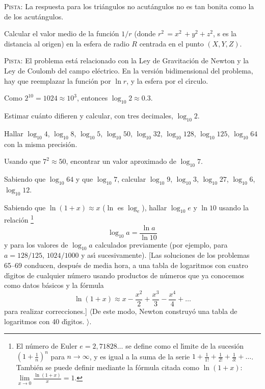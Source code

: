 \documentclass[12pt, spanish]{article}  %
\begin{document}
\textsc{Pista:} La respuesta para los tri\'angulos no acut\'angulos no es tan bonita como la de los acut\'angulos.


\bigskip
{} Calcular el valor medio de la funci\'on $1/r$ (donde
$r^2\,=x^2\,+y^2+z^2$, 
\newline
s es la distancia al origen) en la esfera de radio 
$R$ centrada en el punto $(X,Y,Z)$.

\medskip
\textsc{Pista:} El problema est\'a relacionado con la Ley de Gravitaci\'on de Newton y la Ley de Coulomb del campo el\'ectrico.
En la versi\'on bidimensional del problema, hay que reemplazar la funci\'on por $\ln r$, y la esfera por el c\'{\i}rculo.


\bigskip
{} Como $2^{10}=1024 \approx 10^3$, entonces
$\log_{10} 2 \approx 0{.}3$.

Estimar cu\'anto difieren y calcular, con tres decimales, $\log_{10} 2$. 

\bigskip
{} Hallar $\log_{10} 4$, $\log_{10} 8$,
$\log_{10} 5$, $\log_{10} 50$, $\log_{10} 32$, $\log_{10} 128$,
$\log_{10} 125$, $\log_{10} 64$ con la misma precisi\'on.

\bigskip
{} Usando que $7^2 \approx 50$, encontrar un valor aproximado de $\log_{10} 7$.

\bigskip
{} Sabiendo que $\log_{10} 64$ y que $\log_{10} 7$, calcular $\log_{10} 9$, $\log_{10} 3$,
    $\log_{10} 27$, $\log_{10} 6$, $\log_{10} 12$.

\bigskip
{} Sabiendo que $\ln (1+x) \approx x$ ($\ln$ es $\log_e$), hallar $\log_{10} e$ y
    $\ln 10$ usando la relaci\'on \footnote{
El n\'umero de Euler $e = 2{,}71828\dots$ se define como el l\'{\i}mite de la sucesi\'on
  $\left(1+\frac1n\right)^n$ para $n\to \infty$, y es igual a la suma de la serie  
$1+\frac 1{1!} +\frac 1{2!}+\frac 1{3!}+\dots$. Tambi\'en se puede definir mediante la f\'ormula citada como
 $\ln (1+x)$: $\lim\limits_{x\to 0}\frac{\ln(1+x)}{x} = 1$. }\vspace{-\jot}
%
$$
\log_{10} a=\frac{\ln a}{\ln 10}
$$ 
y para los valores de $\log_{10} a$ calculados previamente (por ejemplo, para $a=128/125$, $1024/1000$
y as\'{\i} sucesivamente).
\newpage
[Las soluciones de los problemas 65--69 conducen, despu\'es de media hora, a una tabla de logaritmos con cuatro d\'{\i}gitos de cualquier n\'umero usando productos de n\'umeros que ya conocemos como datos b\'asicos y la f\'ormula  
\vspace{-2\jot}
\[
\ln (1+x) \approx x-\frac{x^2}{2}+\frac{x^3}{3}-\frac{x^4}{4}+\dots
\]
para realizar correcciones.] $\langle$De este modo, Newton construy\'o una tabla de logaritmos con 40 d\'{\i}gitos.%
$\rangle$.
\end{document}
